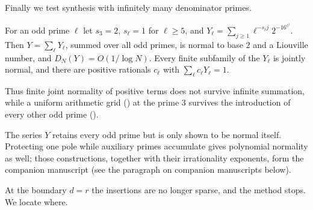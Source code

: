 \documentclass[11pt]{article}
\begin{document}
Finally we test synthesis with infinitely many denominator primes.

\begin{maintheorem}\label{thm:E}
For an odd prime $\ell$ let $s_3=2$, $s_\ell=1$ for $\ell\ge5$, and
$Y_\ell=\sum_{j\ge1}\ell^{-s_\ell j}2^{-16^{\ell^j}}$. Then $Y=\sum_\ell Y_\ell$, summed over all odd
primes, is normal to base $2$ and a Liouville number, and $D_N(Y)=O(1/\log N)$. Every finite
subfamily of the $Y_\ell$ is jointly normal, and there are positive rationals $c_\ell$ with
$\sum_\ell c_\ell Y_\ell=1$.
\end{maintheorem}

Thus finite joint normality of positive terms does not survive infinite summation, while a
uniform arithmetic grid () at the prime $3$ survives the introduction of every other
odd prime ().

The series $Y$ retains every odd prime but is only shown to be normal itself. Protecting one pole
while auxiliary primes accumulate gives polynomial normality as well; those constructions, together
with their irrationality exponents, form the companion manuscript \cite{PaperXII} (see the paragraph on
companion manuscripts below).

At the boundary $d=r$ the insertions are no longer sparse, and the method stops. We locate where.
\end{document}
